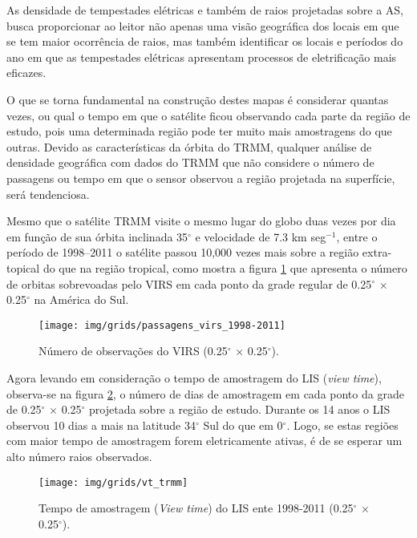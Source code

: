 As densidade de tempestades elétricas e também de raios projetadas sobre a AS, busca proporcionar ao leitor não apenas uma visão geográfica dos locais em que se tem maior ocorrência de raios, mas também identificar os locais e períodos do ano em que as tempestades elétricas apresentam processos de eletrificação mais eficazes.  


O que se torna fundamental na construção destes mapas é considerar quantas vezes, ou qual o tempo em que o satélite ficou observando cada parte da região de estudo, pois uma determinada região pode ter muito mais amostragens do que outras. Devido as características da órbita do TRMM, qualquer análise de densidade geográfica com dados do TRMM que não considere o número de passagens ou tempo em que o sensor observou a região projetada na superfície, será tendenciosa.

Mesmo que o satélite TRMM visite o mesmo lugar do globo duas vezes por dia em função de sua órbita inclinada 35$^{\circ}$ e velocidade de 7.3 km seg$^{-1}$, entre o período de 1998--2011 o satélite passou 10,000 vezes mais sobre a região extra-topical do que na região tropical, como mostra a figura \ref{VirsVT} que apresenta o número de orbitas sobrevoadas pelo VIRS em cada ponto da grade regular de 0.25$^{\circ}$  $\times$ 0.25$^{\circ}$ na América do Sul.

\begin{figure}[!hb]
  \centering
  {{\texttt{[image: img/grids/passagens\_virs\_1998-2011]}}}
\caption{Número de observações do VIRS (0.25$^{\circ}$  $\times$ 0.25$^{\circ}$).}
\label{VirsVT}
\end{figure} 


Agora levando em consideração o tempo de amostragem do LIS (\textit{view time}), observa-se na figura \ref{lisVT}, o número de dias de amostragem em cada ponto da grade de 0.25$^{\circ}$  $\times$ 0.25$^{\circ}$ projetada sobre a região de estudo. Durante os 14 anos o LIS observou 10 dias a mais na latitude 34$^{\circ}$ Sul do que em 0$^{\circ}$. Logo, se estas regiões com maior tempo de amostragem forem eletricamente ativas, é de se esperar um alto número raios observados.

\begin{figure}[!ht]
  \centering
  {{\texttt{[image: img/grids/vt\_trmm]}} }
  \caption{Tempo de amostragem (\textit{View time}) do LIS ente 1998-2011 (0.25$^{\circ}$  $\times$ 0.25$^{\circ}$).}
\label{lisVT}
\end{figure} 

